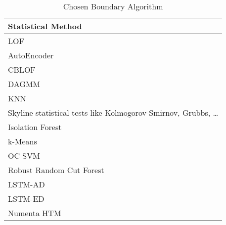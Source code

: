\begin{table}[h]\centering
        \begin{tabular}{l}
            Statistical Method                                                        \\\midrule                                                                               
            LOF                                                                       \\\addlinespace
            AutoEncoder                                                               \\\addlinespace
            CBLOF                                                                     \\\addlinespace
            DAGMM                                                                     \\\addlinespace
            KNN                                                                       \\\addlinespace
            Skyline statistical tests like Kolmogorov-Smirnov, Grubbs, \ldots         \\\addlinespace
            Isolation Forest                                                          \\\addlinespace
            k-Means                                                                   \\\addlinespace
            OC-SVM                                                                    \\\addlinespace
            Robust Random Cut Forest                                                  \\\addlinespace
            LSTM-AD                                                                   \\\addlinespace
            LSTM-ED                                                                   \\\addlinespace
            Numenta HTM                                                               \\
        \end{tabular}
    \caption{Chosen Boundary Algorithm}\label{tab:chosen-boundary-algo}
\end{table}



